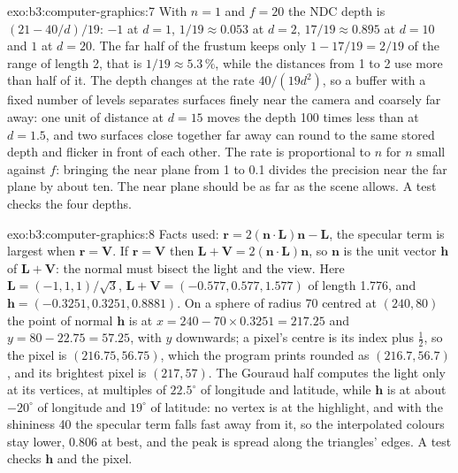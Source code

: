 \begin{solution}{exo:b3:computer-graphics:7}
With $n = 1$ and $f = 20$ the NDC depth is $(21 - 40/d)/19$: $-1$ at $d = 1$, $1/19 \approx 0.053$ at $d = 2$, $17/19 \approx 0.895$ at $d = 10$ and $1$ at $d = 20$. The far half of the frustum keeps only $1 - 17/19 = 2/19$ of the range of length 2, that is $1/19 \approx 5.3\,\%$, while the distances from 1 to 2 use more than half of it. The depth changes at the rate $40/(19 d^2)$, so a buffer with a fixed number of levels separates surfaces finely near the camera and coarsely far away: one unit of distance at $d = 15$ moves the depth 100 times less than at $d = 1.5$, and two surfaces close together far away can round to the same stored depth and flicker in front of each other. The rate is proportional to $n$ for $n$ small against $f$: bringing the near plane from 1 to 0.1 divides the precision near the far plane by about ten. The near plane should be as far as the scene allows. A test checks the four depths.
\end{solution}

\begin{solution}{exo:b3:computer-graphics:8}
Facts used: $\mathbf r = 2(\mathbf n \cdot \mathbf L)\mathbf n - \mathbf L$, the specular term is largest when $\mathbf r = \mathbf V$. If $\mathbf r = \mathbf V$ then $\mathbf L + \mathbf V = 2(\mathbf n \cdot \mathbf L)\mathbf n$, so $\mathbf n$ is the unit vector $\mathbf h$ of $\mathbf L + \mathbf V$: the normal must bisect the light and the view. Here $\mathbf L = (-1, 1, 1)/\sqrt3$, $\mathbf L + \mathbf V = (-0.577, 0.577, 1.577)$ of length 1.776, and $\mathbf h = (-0.3251, 0.3251, 0.8881)$. On a sphere of radius 70 centred at $(240, 80)$ the point of normal $\mathbf h$ is at $x = 240 - 70 \times 0.3251 = 217.25$ and $y = 80 - 22.75 = 57.25$, with $y$ downwards; a pixel's centre is its index plus $\frac12$, so the pixel is $(216.75, 56.75)$, which the program prints rounded as $(216.7, 56.7)$, and its brightest pixel is $(217, 57)$. The Gouraud half computes the light only at its vertices, at multiples of $22.5^\circ$ of longitude and latitude, while $\mathbf h$ is at about $-20^\circ$ of longitude and $19^\circ$ of latitude: no vertex is at the highlight, and with the shininess 40 the specular term falls fast away from it, so the interpolated colours stay lower, 0.806 at best, and the peak is spread along the triangles' edges. A test checks $\mathbf h$ and the pixel.
\end{solution}

